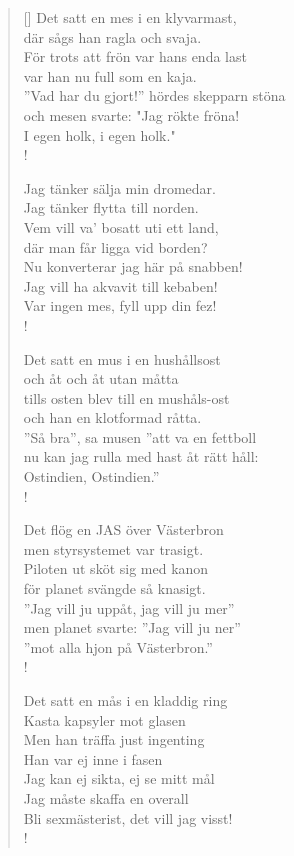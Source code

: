 \documentclass[11pt, a4paper]{memoir} %
\begin{document}
\begin{verse}[\versewidth]
Det satt en mes i en klyvarmast, \\
där sågs han ragla och svaja. \\
För trots att frön var hans enda last \\
var han nu full som en kaja. \\
''Vad har du gjort!'' hördes skepparn stöna \\
och mesen svarte: "Jag rökte fröna! \\
I egen holk, i egen holk." \\!

Jag tänker sälja min dromedar. \\
Jag tänker flytta till norden. \\
Vem vill va’ bosatt uti ett land, \\
där man får ligga vid borden? \\
Nu konverterar jag här på snabben! \\
Jag vill ha akvavit till kebaben! \\
Var ingen mes, fyll upp din fez! \\!

Det satt en mus i en hushållsost \\
och åt och åt utan måtta \\
tills osten blev till en mushåls-ost \\
och han en klotformad råtta. \\
''Så bra'', sa musen ''att va en fettboll \\
nu kan jag rulla med hast åt rätt håll: \\
Ostindien, Ostindien.'' \\!

Det flög en JAS över Västerbron \\
men styrsystemet var trasigt. \\
Piloten ut sköt sig med kanon \\
för planet svängde så knasigt. \\
''Jag vill ju uppåt, jag vill ju mer''\\ 
men planet svarte: ''Jag vill ju ner'' \\
''mot alla hjon på Västerbron.'' \\!

Det satt en mås i en kladdig ring\\
Kasta kapsyler mot glasen\\
Men han träffa just ingenting\\
Han var ej inne i fasen\\
Jag kan ej sikta, ej se mitt mål\\
Jag måste skaffa en overall\\
Bli sexmästerist, det vill jag visst!\\!


\end{verse}
\end{document}
